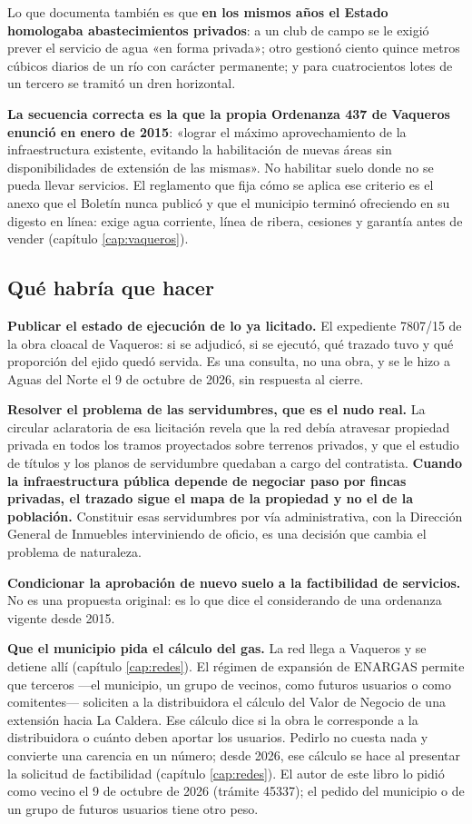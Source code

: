 Lo que documenta también es que \textbf{en los mismos años el Estado homologaba
abastecimientos privados}: a un club de campo se le exigió prever el servicio de agua «en
forma privada»; otro gestionó ciento quince metros cúbicos diarios de un río con
carácter permanente; y para cuatrocientos lotes de un tercero se tramitó un dren horizontal.

\textbf{La secuencia correcta es la que la propia Ordenanza 437 de Vaqueros enunció en
enero de 2015}: «lograr el máximo aprovechamiento de la infraestructura existente,
evitando la habilitación de nuevas áreas sin disponibilidades de extensión de las mismas». No
habilitar suelo donde no se pueda llevar servicios. El reglamento que fija cómo se aplica ese
criterio es el anexo que el Boletín nunca publicó y que el municipio terminó ofreciendo en su digesto en línea: exige agua corriente, línea de ribera, cesiones y garantía antes de vender (capítulo \ref{cap:vaqueros}).

\subsection*{Qué habría que hacer}

\textbf{Publicar el estado de ejecución de lo ya licitado.} El expediente 7807/15 de la obra
cloacal de Vaqueros: si se adjudicó, si se ejecutó, qué trazado tuvo y qué proporción del ejido quedó servida. Es una consulta, no una obra, y se le hizo a Aguas del Norte el 9 de octubre de 2026, sin respuesta al cierre.

\textbf{Resolver el problema de las servidumbres, que es el nudo real.} La circular
aclaratoria de esa licitación revela que la red debía atravesar propiedad privada en todos los
tramos proyectados sobre terrenos privados, y que el estudio de títulos y los planos de
servidumbre quedaban a cargo del contratista. \textbf{Cuando la infraestructura pública
depende de negociar paso por fincas privadas, el trazado sigue el mapa de la propiedad y no
el de la población.} Constituir esas servidumbres por vía administrativa, con la Dirección
General de Inmuebles interviniendo de oficio, es una decisión que cambia el problema de
naturaleza.

\textbf{Condicionar la aprobación de nuevo suelo a la factibilidad de servicios.} No es una
propuesta original: es lo que dice el considerando de una ordenanza vigente desde 2015.

\textbf{Que el municipio pida el cálculo del gas.} La red llega a Vaqueros y se detiene allí (capítulo \ref{cap:redes}). El régimen de expansión de ENARGAS permite que terceros ---el municipio, un grupo de vecinos, como futuros usuarios o como comitentes--- soliciten a la distribuidora el cálculo del Valor de Negocio de una extensión hacia La Caldera. Ese cálculo dice si la obra le corresponde a la distribuidora o cuánto deben aportar los usuarios. Pedirlo no cuesta nada y convierte una carencia en un número; desde 2026, ese cálculo se hace al presentar la solicitud de factibilidad (capítulo \ref{cap:redes}). El autor de este libro lo pidió como vecino el 9 de octubre de 2026 (trámite 45337); el pedido del municipio o de un grupo de futuros usuarios tiene otro peso.

